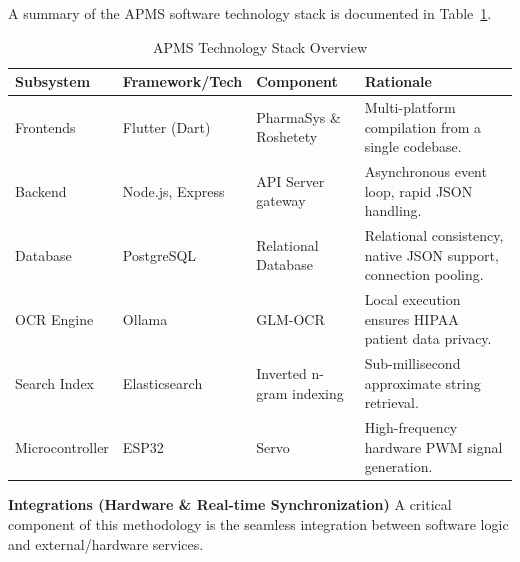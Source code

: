 \documentclass[12pt,a4paper,oneside]{report}
\begin{document}
A summary of the APMS software technology stack is documented in Table~\ref{tab:tech_stack}.

\begin{table}[htbp]
    \centering
    \caption{APMS Technology Stack Overview}
    \label{tab:tech_stack}
    \vspace{0.5em}
    \small
    \begin{tabular}{ll p{3.2cm} p{5.5cm}}
        \toprule
        \textbf{Subsystem} & \textbf{Framework/Tech} & \textbf{Component} & \textbf{Rationale} \\
        \midrule
        Frontends & Flutter (Dart) & PharmaSys \& Roshetety & Multi-platform compilation from a single codebase. \\
        \addlinespace
        Backend & Node.js, Express & API Server gateway & Asynchronous event loop, rapid JSON handling. \\
        \addlinespace
        Database & PostgreSQL & Relational Database & Relational consistency, native JSON support, connection pooling. \\
        \addlinespace
        OCR Engine & Ollama & GLM-OCR & Local execution ensures HIPAA patient data privacy. \\
        \addlinespace
        Search Index & Elasticsearch & Inverted n-gram indexing & Sub-millisecond approximate string retrieval. \\
        \addlinespace
        Microcontroller & ESP32 & Servo & High-frequency hardware PWM signal generation. \\
        \bottomrule
    \end{tabular}
\end{table}

\textbf{Integrations (Hardware \& Real-time Synchronization)} A critical
component of this methodology is the seamless integration between
software logic and external/hardware services.
\end{document}
